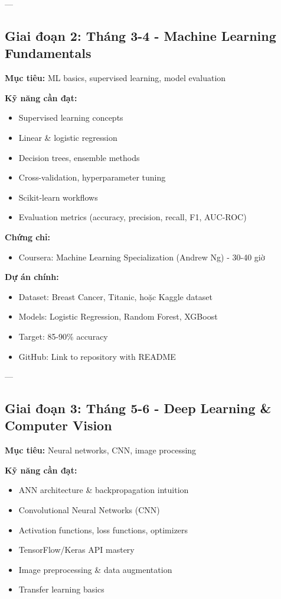 \documentclass[12pt,a4paper]{article}
\begin{document}
---

\subsection{Giai đoạn 2: Tháng 3-4 - Machine Learning Fundamentals}

\textbf{Mục tiêu:} ML basics, supervised learning, model evaluation

\textbf{Kỹ năng cần đạt:}
\begin{itemize}
    \item Supervised learning concepts
    \item Linear \& logistic regression
    \item Decision trees, ensemble methods
    \item Cross-validation, hyperparameter tuning
    \item Scikit-learn workflows
    \item Evaluation metrics (accuracy, precision, recall, F1, AUC-ROC)
\end{itemize}

\textbf{Chứng chỉ:}
\begin{itemize}
    \item Coursera: Machine Learning Specialization (Andrew Ng) - 30-40 giờ
\end{itemize}

\textbf{Dự án chính:}
\begin{itemize}
    \item Dataset: Breast Cancer, Titanic, hoặc Kaggle dataset
    \item Models: Logistic Regression, Random Forest, XGBoost
    \item Target: 85-90\% accuracy
    \item GitHub: Link to repository with README
\end{itemize}

---

\subsection{Giai đoạn 3: Tháng 5-6 - Deep Learning \& Computer Vision}

\textbf{Mục tiêu:} Neural networks, CNN, image processing

\textbf{Kỹ năng cần đạt:}
\begin{itemize}
    \item ANN architecture \& backpropagation intuition
    \item Convolutional Neural Networks (CNN)
    \item Activation functions, loss functions, optimizers
    \item TensorFlow/Keras API mastery
    \item Image preprocessing \& data augmentation
    \item Transfer learning basics
\end{itemize}
\end{document}

